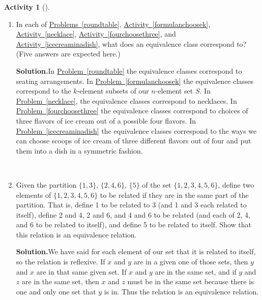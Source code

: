 \documentclass[10pt,]{book}
\theoremstyle{plain}
\theoremstyle{definition}
\newtheorem{activity}[project]{Activity}
\numberwithin{equation}{chapter}
\begin{document}
\begin{activity}[]\label{partitiontoequivalence}
~\par
\begin{enumerate}[label=(\alph*)]
 \item In each of \hyperref[roundtable]{Problems~\ref{roundtable}}, \hyperref[formulanchoosek]{Activity~\ref{formulanchoosek}}, \hyperref[necklace]{Activity~\ref{necklace}}, \hyperref[fourchoosethree]{Activity~\ref{fourchoosethree}}, and \hyperref[icecreaminadish]{Activity~\ref{icecreaminadish}}, what does an equivalence class correspond to? (Five answers are expected here.)%
\par\medskip\noindent%
\textbf{Solution.}\quad In \hyperref[roundtable]{Problem~\ref{roundtable}} the equivalence classes correspond to seating arrangements. In \hyperref[formulanchoosek]{Problem~\ref{formulanchoosek}} the equivalence classes correspond to the \(k\)-element subsets of our \(n\)-element set \(S\). In \hyperref[necklace]{Problem~\ref{necklace}}, the equivalence classes correspond to necklaces. In \hyperref[fourchoosethree]{Problem~\ref{fourchoosethree}} the equivalence classes correspond to choices of three flavors of ice cream out of a possible four flavors. In \hyperref[icecreaminadish]{Problem~\ref{icecreaminadish}} the equivalence classes correspond to the ways we can choose scoops of ice cream of three different flavors out of four and put them into a dish in a symmetric fashion.%

~\par
\item Given the partition \(\{1,3\}\), \(\{2,4,6\}\), \(\{5\}\) of the set \(\{1,2,3,4,5,6\}\), define two elements of \(\{1,2,3,4,5,6\}\) to be related if they are in the same part of the partition. That is, define 1 to be related to 3 (and 1 and 3 each related to itself), define 2 and 4, 2 and 6, and 4 and 6 to be related (and each of 2, 4, and 6 to be related to itself), and define 5 to be related to itself. Show that this relation is an equivalence relation.%
\par\medskip\noindent%
\textbf{Solution.}\quad We have said for each element of our set that it is related to itself, so the relation is reflexive. If \(x\) and \(y\) are in a given one of those sets, then \(y\) and \(x\) are in that same given set. If \(x\) and \(y\) are in the same set, and if \(y\) and \(z\) are in the same set, then \(x\) and \(z\) must be in the same set because there is one and only one set that \(y\) is in. Thus the relation is an equivalence relation.%


\end{enumerate}
\end{activity}
\end{document}
